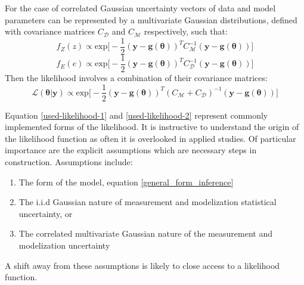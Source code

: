 \begin{tcolorbox}
For the case of correlated Gaussian uncertainty vectors of data and model parameters can be represented by a multivariate Gaussian distributions, defined with covariance matrices $C_{\mathcal{D}}$ and $C_{\mathcal{M}}$ respectively, such that:
\begin{equation}
f_Z(z) \propto \text{exp}\bigg[-\frac{1}{2}(\bm{y}-\bm{g}(\bm{\theta}))^TC_{\mathcal{M}}^{-1}(\bm{y}-\bm{g}(\bm{\theta}))\bigg]
\end{equation}
\begin{equation}
f_E(e) \propto \text{exp}\bigg[-\frac{1}{2}(\bm{y}-\bm{g}(\bm{\theta}))^TC_{\mathcal{D}}^{-1}(\bm{y}-\bm{g}(\bm{\theta}))\bigg]
\end{equation}
Then the likelihood involves a combination of their covariance matrices:
\begin{equation}
\mathcal{L}(\bm{\theta}|\bm{y}) \propto \text{exp}\bigg[-\frac{1}{2}(\bm{y}-\bm{g}(\bm{\theta}))^T(C_{\mathcal{M}}+C_{\mathcal{D}})^{-1}(\bm{y}-\bm{g}(\bm{\theta}))\bigg]
\label{used-likelihood-2}
\end{equation}

\end{tcolorbox}



\begin{tcolorbox}
Equation \ref{used-likelihood-1} and \ref{used-likelihood-2} represent commonly implemented forms of the likelihood. It is instructive to understand the origin of the likelihood function as often it is overlooked in applied studies. Of particular importance are the explicit assumptions which are necessary steps in construction. Assumptions include:
\begin{enumerate}
\item The form of the model, equation \ref{general_form_inference}
\item The i.i.d Gaussian nature of measurement and modelization statistical uncertainty, or
\item The correlated multivariate Gaussian nature of the measurement and modelization uncertainty
\end{enumerate}
A shift away from these assumptions is likely to close access to a likelihood function.

\end{tcolorbox}